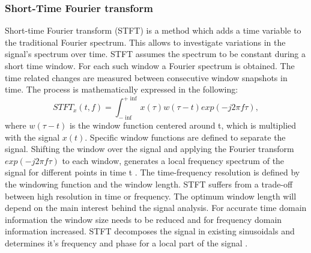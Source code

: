\subsubsection{Short-Time Fourier transform}
Short-time Fourier transform (STFT) is a method which adds a time variable to the traditional Fourier spectrum. This allows to investigate variations in the signal's spectrum over time. STFT assumes the spectrum to be constant during a short time window. For each such window a Fourier spectrum is obtained. The time related changes are measured between consecutive window snapshots in time. The process is mathematically expressed in the following:  
\begin{equation}
    STFT_{x}(t,f) = \int_{- \inf}^{+ \inf}x(\tau) w(\tau -t) exp(-j2\pi f \tau),
\end{equation}
where  $w(\tau -t)$ is the window function centered around t, which is multiplied with the signal $x(t)$. Specific window functions are defined to separate the signal. Shifting the window over the signal and applying the Fourier transform $exp(-j2\pi f \tau)$ to each window, generates a local frequency spectrum of the signal for different points in time t \cite{FENG2013}. The time-frequency resolution is defined by the windowing function and the window length. STFT suffers from a trade-off between high resolution in time or frequency. The optimum window length will depend on the main interest behind the signal analysis. For accurate time domain information the window size needs to be reduced and for frequency domain information increased. STFT  decomposes the signal in existing sinusoidals and determines it's frequency and phase for a local part of the signal \cite{Hlawatsch1992}. 

